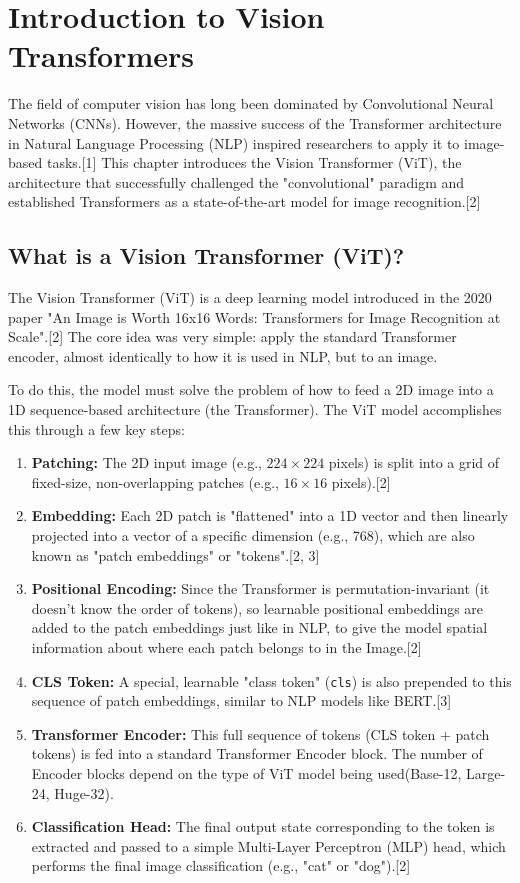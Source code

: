 

\chapter{Introduction to Vision Transformers}

The field of computer vision has long been dominated by Convolutional Neural Networks (CNNs). However, the massive success of the Transformer architecture in Natural Language Processing (NLP) inspired researchers to apply it to image-based tasks.[1] This chapter introduces the Vision Transformer (ViT), the architecture that successfully challenged the "convolutional" paradigm and established Transformers as a state-of-the-art model for image recognition.[2]

\section{What is a Vision Transformer (ViT)?}

The Vision Transformer (ViT) is a deep learning model introduced in the 2020 paper "An Image is Worth 16x16 Words: Transformers for Image Recognition at Scale".[2] The core idea was very simple: apply the standard Transformer encoder, almost identically to how it is used in NLP, but to an image.

To do this, the model must solve the problem of how to feed a 2D image into a 1D sequence-based architecture (the Transformer). The ViT model accomplishes this through a few key steps:
\begin{enumerate}
    \item \textbf{Patching:} The 2D input image (e.g., $224 \times 224$ pixels) is split into a grid of fixed-size, non-overlapping patches (e.g., $16 \times 16$ pixels).[2]
    \item \textbf{Embedding:} Each 2D patch is "flattened" into a 1D vector and then linearly projected into a vector of a specific dimension (e.g., 768), which are also known as "patch embeddings" or "tokens".[2, 3]
    \item \textbf{Positional Encoding:} Since the Transformer is permutation-invariant (it doesn't know the order of tokens), so learnable positional embeddings are added to the patch embeddings just like in NLP, to give the model spatial information about where each patch belongs to in the Image.[2]
    \item \textbf{CLS Token:} A special, learnable "class token" (\texttt{cls}) is also prepended to this sequence of patch embeddings, similar to NLP models like BERT.[3]
    \item \textbf{Transformer Encoder:} This full sequence of tokens (CLS token + patch tokens) is fed into a standard Transformer Encoder block. The number of Encoder blocks depend on the type of ViT model being used(Base-12, Large-24, Huge-32). 
    \item \textbf{Classification Head:} The final output state corresponding to the token is extracted and passed to a simple Multi-Layer Perceptron (MLP) head, which performs the final image classification (e.g., "cat" or "dog").[2]
\end{enumerate}

